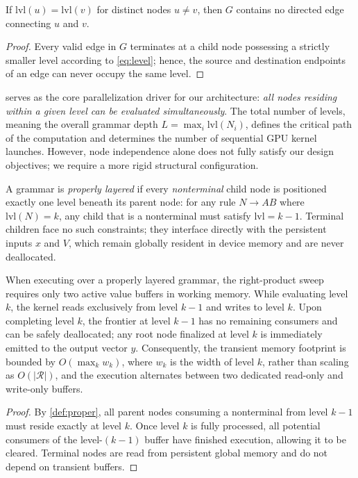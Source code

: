 \documentclass[twoside,leqno,twocolumn]{article}
\begin{document}
\begin{lemma}
\label{lem:antichain}
If $\mathrm{lvl}(u)=\mathrm{lvl}(v) $ for distinct nodes $u\neq v$, then $G$ contains no directed edge connecting $u$ and $v$.
\end{lemma}
\begin{proof}
Every valid edge in $G$ terminates at a child node possessing a strictly smaller level according to \cref{eq:level}; hence, the source and destination endpoints of an edge can never occupy the same level.
\end{proof}

 serves as the core parallelization driver for our architecture: \emph{all nodes residing within a given level can be evaluated simultaneously}. The total number of levels, meaning the overall grammar depth $L=\max_i\mathrm{lvl}(N_i)$, defines the critical path of the computation and determines the number of sequential GPU kernel launches. However, node independence alone does not fully satisfy our design objectives; we require a more rigid structural configuration.

\begin{definition}
\label{def:proper}
A grammar is \emph{properly layered} if every \emph{nonterminal} child node is positioned exactly one level beneath its parent node: for any rule $N\to AB$ where $\mathrm{lvl}(N)=k$, any child that is a nonterminal must satisfy $\mathrm{lvl}=k-1$. Terminal children face no such constraints; they interface directly with the persistent inputs $x$ and $V$, which remain globally resident in device memory and are never deallocated.
\end{definition}

\begin{lemma}
\label{lem:liveness}
When executing over a properly layered grammar, the right-product sweep requires only two active value buffers in working memory. While evaluating level $k$, the kernel reads exclusively from level $k-1$ and writes to level $k$. Upon completing level $k$, the frontier at level $k-1$ has no remaining consumers and can be safely deallocated; any root node finalized at level $k$ is immediately emitted to the output vector $y$. Consequently, the transient memory footprint is bounded by $O(\max_k w_k)$, where $w_k$ is the width of level $k$, rather than scaling as $O(|\mathcal{R}|)$, and the execution alternates between two dedicated read-only and write-only buffers.
\end{lemma}
\begin{proof}
By \cref{def:proper}, all parent nodes consuming a nonterminal from level $k-1$ must reside exactly at level $k$. Once level $k$ is fully processed, all potential consumers of the level-$(k-1)$ buffer have finished execution, allowing it to be cleared. Terminal nodes are read from persistent global memory and do not depend on transient buffers.
\end{proof}
\end{document}
